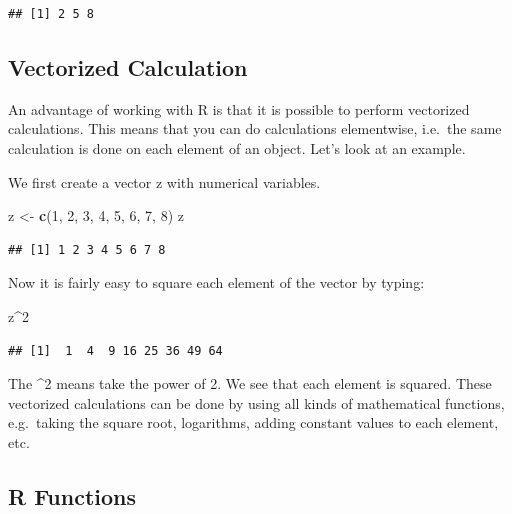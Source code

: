 \documentclass[]{book}
\newenvironment{Shaded}{\begin{snugshade}}{\end{snugshade}}
\newcommand{\KeywordTok}[1]{\textcolor[rgb]{0.13,0.29,0.53}{\textbf{#1}}}
\newcommand{\DecValTok}[1]{\textcolor[rgb]{0.00,0.00,0.81}{#1}}
\newcommand{\StringTok}[1]{\textcolor[rgb]{0.31,0.60,0.02}{#1}}
\newcommand{\OperatorTok}[1]{\textcolor[rgb]{0.81,0.36,0.00}{\textbf{#1}}}
\newcommand{\NormalTok}[1]{#1}
\begin{document}
\begin{verbatim}
## [1] 2 5 8
\end{verbatim}

\subsection{Vectorized Calculation}\label{vectorized-calculation}

An advantage of working with R is that it is possible to perform
vectorized calculations. This means that you can do calculations
elementwise, i.e.~the same calculation is done on each element of an
object. Let's look at an example.

We first create a vector z with numerical variables.

\begin{Shaded}
\begin{Highlighting}[]
\NormalTok{z <-}\StringTok{ }\KeywordTok{c}\NormalTok{(}\DecValTok{1}\NormalTok{, }\DecValTok{2}\NormalTok{, }\DecValTok{3}\NormalTok{, }\DecValTok{4}\NormalTok{, }\DecValTok{5}\NormalTok{, }\DecValTok{6}\NormalTok{, }\DecValTok{7}\NormalTok{, }\DecValTok{8}\NormalTok{)}
\NormalTok{z}
\end{Highlighting}
\end{Shaded}

\begin{verbatim}
## [1] 1 2 3 4 5 6 7 8
\end{verbatim}

Now it is fairly easy to square each element of the vector by typing:

\begin{Shaded}
\begin{Highlighting}[]
\NormalTok{z}\OperatorTok{^}\DecValTok{2}
\end{Highlighting}
\end{Shaded}

\begin{verbatim}
## [1]  1  4  9 16 25 36 49 64
\end{verbatim}

The \^{}2 means take the power of 2. We see that each element is
squared. These vectorized calculations can be done by using all kinds of
mathematical functions, e.g.~taking the square root, logarithms, adding
constant values to each element, etc.

\subsection{R Functions}\label{r-functions}
\end{document}
